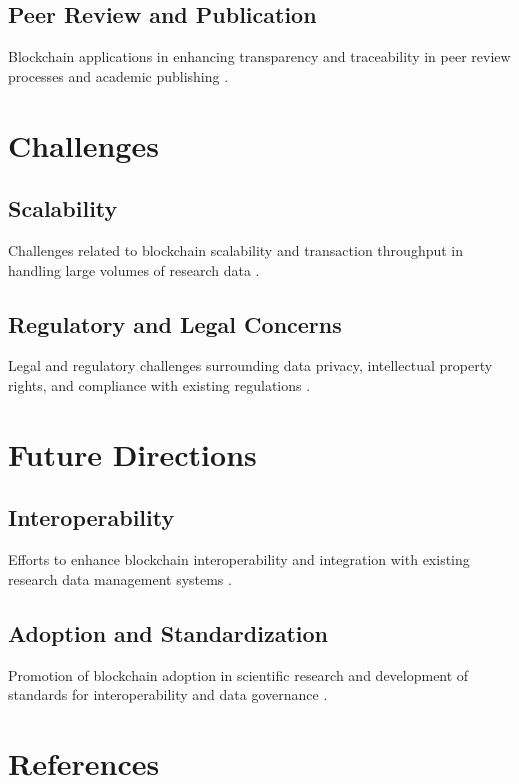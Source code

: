 \documentclass[12pt]{article}
\begin{document}
\subsection{Peer Review and Publication}
Blockchain applications in enhancing transparency and traceability in peer review processes and academic publishing \citep{park2018blockchain, wang2020blockchain}.

\section{Challenges}
\subsection{Scalability}
Challenges related to blockchain scalability and transaction throughput in handling large volumes of research data \citep{bano2017consensus, gencer2018decentralization}.

\subsection{Regulatory and Legal Concerns}
Legal and regulatory challenges surrounding data privacy, intellectual property rights, and compliance with existing regulations \citep{swan2015blockchain, zyskind2015decentralizing}.

\section{Future Directions}
\subsection{Interoperability}
Efforts to enhance blockchain interoperability and integration with existing research data management systems \citep{dillon2019blockchain, mayer2017interoperability}.

\subsection{Adoption and Standardization}
Promotion of blockchain adoption in scientific research and development of standards for interoperability and data governance \citep{mattila2018blockchain, yue2020blockchain}.

\section*{References}


\end{document}
